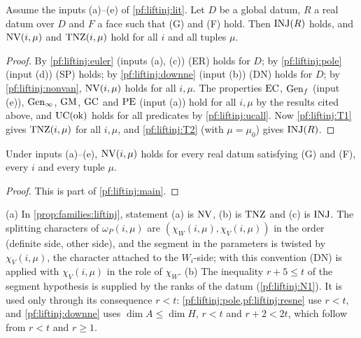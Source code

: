\begin{theorem}\label{pf:liftinj:main}
Assume the inputs (a)--(e) of \cref{pf:liftinj:lit}. Let $D$ be a global datum, $R$ a real datum over $D$ and $F$ a face such that (G) and (F) hold.
Then $\mathrm{INJ}(R)$ holds, and $\mathrm{NV}(i,\mu)$ and $\mathrm{TNZ}(i,\mu)$ hold for all $i$ and all tuples $\mu$.
\end{theorem}

\begin{proof}
By \cref{pf:liftinj:euler} (inputs (a), (c)) (ER) holds for $D$; by \cref{pf:liftinj:pole} (input (d)) (SP) holds; by \cref{pf:liftinj:downne} (input
(b)) (DN) holds for $D$; by \cref{pf:liftinj:nonvan}, $\mathrm{NV}(i,\mu)$ holds for all $i,\mu$. The properties $\mathrm{EC}$,
$\mathrm{Gen}_f$ (input (e)), $\mathrm{Gen}_\infty$, $\mathrm{GM}$, $\mathrm{GC}$ and $\mathrm{PE}$ (input (a)) hold for all $i,\mu$ by the
results cited above, and $\mathrm{UC}(\mathrm{ok})$ holds for all predicates by \cref{pf:liftinj:ucall}. Now \ref{pf:liftinj:T1} gives
$\mathrm{TNZ}(i,\mu)$ for all $i,\mu$, and \ref{pf:liftinj:T2} (with $\mu=\mu_0$) gives $\mathrm{INJ}(R)$.
\end{proof}

\begin{corollary}\label{pf:liftinj:nvcor}
Under inputs (a)--(e), $\mathrm{NV}(i,\mu)$ holds for every real datum satisfying (G) and (F), every $i$ and every tuple $\mu$.
\end{corollary}

\begin{proof}
This is part of \cref{pf:liftinj:main}.
\end{proof}

\begin{remark}\label{pf:liftinj:mainrem}
(a) In \cref{prop:families:liftinj}, statement (a) is $\mathrm{NV}$, (b) is $\mathrm{TNZ}$ and (c) is $\mathrm{INJ}$. The splitting characters of
$\omega_P(i,\mu)$ are $(\chi_W(i,\mu),\chi_V(i,\mu))$ in the order (definite side, other side), and the segment in the parameters is twisted by
$\chi_V(i,\mu)$, the character attached to the $W_i$-side; with this convention (DN) is applied with $\chi_V(i,\mu)$ in the role of $\chi_W$.
(b) The inequality $r+5\le t$ of the segment hypothesis is supplied by the ranks of the datum (\ref{pf:liftinj:N1}). It is used only through its
consequence $r<t$: \cref{pf:liftinj:pole,pf:liftinj:resne} use $r<t$, and \cref{pf:liftinj:downne} uses $\dim A\le\dim H$, $r<t$ and $r+2<2t$,
which follow from $r<t$ and $r\ge1$.
\end{remark}

